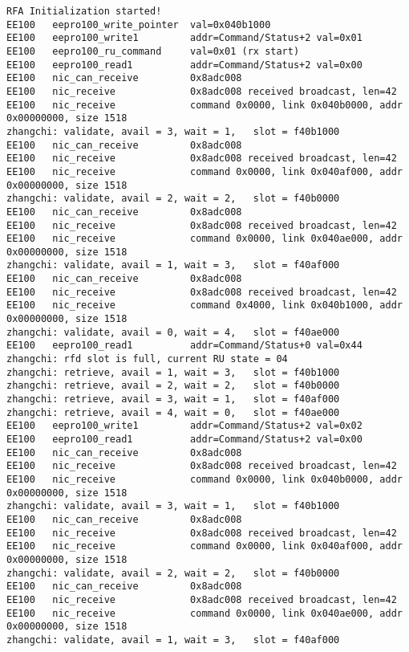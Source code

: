 \documentclass{article}
\begin{document}
\begin{CJK*}{UTF8}{gkai}
\begin{lstlisting}[style=console, basicstyle=\tiny\color{green}\ttfamily\bfseries]
RFA Initialization started! 
EE100	eepro100_write_pointer  val=0x040b1000
EE100	eepro100_write1         addr=Command/Status+2 val=0x01
EE100	eepro100_ru_command     val=0x01 (rx start)
EE100	eepro100_read1          addr=Command/Status+2 val=0x00
EE100	nic_can_receive         0x8adc008
EE100	nic_receive             0x8adc008 received broadcast, len=42
EE100	nic_receive             command 0x0000, link 0x040b0000, addr 0x00000000, size 1518
zhangchi: validate, avail = 3, wait = 1,   slot = f40b1000
EE100	nic_can_receive         0x8adc008
EE100	nic_receive             0x8adc008 received broadcast, len=42
EE100	nic_receive             command 0x0000, link 0x040af000, addr 0x00000000, size 1518
zhangchi: validate, avail = 2, wait = 2,   slot = f40b0000
EE100	nic_can_receive         0x8adc008
EE100	nic_receive             0x8adc008 received broadcast, len=42
EE100	nic_receive             command 0x0000, link 0x040ae000, addr 0x00000000, size 1518
zhangchi: validate, avail = 1, wait = 3,   slot = f40af000
EE100	nic_can_receive         0x8adc008
EE100	nic_receive             0x8adc008 received broadcast, len=42
EE100	nic_receive             command 0x4000, link 0x040b1000, addr 0x00000000, size 1518
zhangchi: validate, avail = 0, wait = 4,   slot = f40ae000
EE100	eepro100_read1          addr=Command/Status+0 val=0x44
zhangchi: rfd slot is full, current RU state = 04
zhangchi: retrieve, avail = 1, wait = 3,   slot = f40b1000
zhangchi: retrieve, avail = 2, wait = 2,   slot = f40b0000
zhangchi: retrieve, avail = 3, wait = 1,   slot = f40af000
zhangchi: retrieve, avail = 4, wait = 0,   slot = f40ae000
EE100	eepro100_write1         addr=Command/Status+2 val=0x02
EE100	eepro100_read1          addr=Command/Status+2 val=0x00
EE100	nic_can_receive         0x8adc008
EE100	nic_receive             0x8adc008 received broadcast, len=42
EE100	nic_receive             command 0x0000, link 0x040b0000, addr 0x00000000, size 1518
zhangchi: validate, avail = 3, wait = 1,   slot = f40b1000
EE100	nic_can_receive         0x8adc008
EE100	nic_receive             0x8adc008 received broadcast, len=42
EE100	nic_receive             command 0x0000, link 0x040af000, addr 0x00000000, size 1518
zhangchi: validate, avail = 2, wait = 2,   slot = f40b0000
EE100	nic_can_receive         0x8adc008
EE100	nic_receive             0x8adc008 received broadcast, len=42
EE100	nic_receive             command 0x0000, link 0x040ae000, addr 0x00000000, size 1518
zhangchi: validate, avail = 1, wait = 3,   slot = f40af000
\end{lstlisting}


\end{CJK*}
\end{document}

